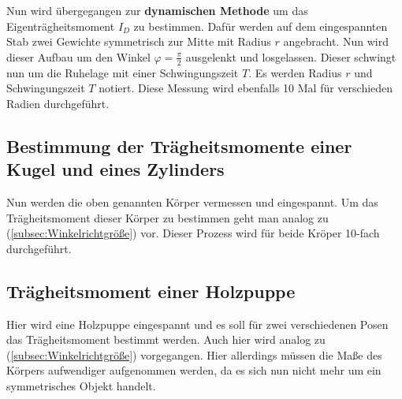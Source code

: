 Nun wird übergegangen zur \textbf{dynamischen Methode} um das Eigenträgheitsmoment $I_{D}$ zu bestimmen.
Dafür werden auf dem eingespannten Stab zwei Gewichte symmetrisch zur Mitte mit Radius $r$ angebracht.
Nun wird dieser Aufbau um den Winkel $\varphi = \frac{\pi}{2}$ ausgelenkt und losgelassen.
Dieser schwingt nun um die Ruhelage mit einer Schwingungszeit $T$.
Es werden Radius $r$ und Schwingungszeit $T$ notiert.
Diese Messung wird ebenfalls 10 Mal für verschieden Radien durchgeführt.


\subsection{Bestimmung der Trägheitsmomente einer Kugel und eines Zylinders}
Nun werden die oben genannten Körper vermessen und eingespannt.
Um das Trägheitsmoment dieser Körper zu bestimmen geht man analog zu (\ref{subsec:Winkelrichtgröße}) vor.
Dieser Prozess wird für beide Kröper 10-fach durchgeführt.

\subsection{Trägheitsmoment einer Holzpuppe}
Hier wird eine Holzpuppe eingespannt und es soll für zwei verschiedenen Posen das Trägheitsmoment bestimmt werden.
Auch hier wird analog zu (\ref{subsec:Winkelrichtgröße}) vorgegangen.
Hier allerdings müssen die Maße des Körpers aufwendiger aufgenommen werden, da es sich nun nicht mehr um ein symmetrisches Objekt handelt.